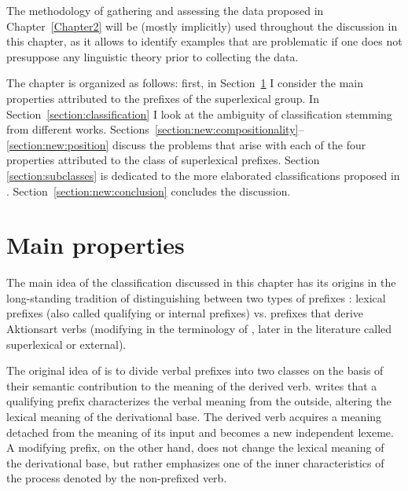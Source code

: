  The methodology of gathering and assessing the data proposed in Chapter~\ref{Chapter2} will be (mostly implicitly) used throughout the discussion in this chapter, as it allows to identify examples that are problematic if one does not presuppose any linguistic theory prior to collecting the data.

The chapter is organized as follows: first, in Section~\ref{section:properties} I consider the main properties attributed to the prefixes of the superlexical group. In Section~\ref{section:classification} I look at the ambiguity of classification stemming from different works. Sections~\ref{section:new:compositionality}--\ref{section:new:position} discuss the problems that arise with each of the four properties attributed to the class of superlexical prefixes. Section \ref{section:subclasses} is dedicated to the more elaborated classifications proposed in \citet{Tatevosov:07,Tatevosov:09}. Section~\ref{section:new:conclusion} concludes the discussion.
\section{Main properties}\label{section:properties}
The main idea of the classification discussed in this chapter has its origins in the long-standing tradition of distinguishing between two types of prefixes \citep{Isachenko:60, Forsyth:70, Townsend:75}: lexical prefixes (also called qualifying or internal prefixes) vs. prefixes that derive Aktionsart verbs (modifying in the terminology of \citeauthor{Isachenko:60}, later in the literature called superlexical or external).

The original idea of \citet[222--224]{Isachenko:60} is to divide verbal prefixes into two classes on the basis of their semantic contribution to the meaning of the derived verb. \citeauthor{Isachenko:60} writes that a qualifying prefix characterizes the verbal meaning from the outside, altering the lexical meaning of the derivational base. The derived verb acquires a meaning detached from the meaning of its input and becomes a new independent lexeme. A modifying prefix, on the other hand, does not change the lexical meaning of the derivational base, but rather emphasizes one of the inner characteristics of the process denoted by the non-prefixed verb.

